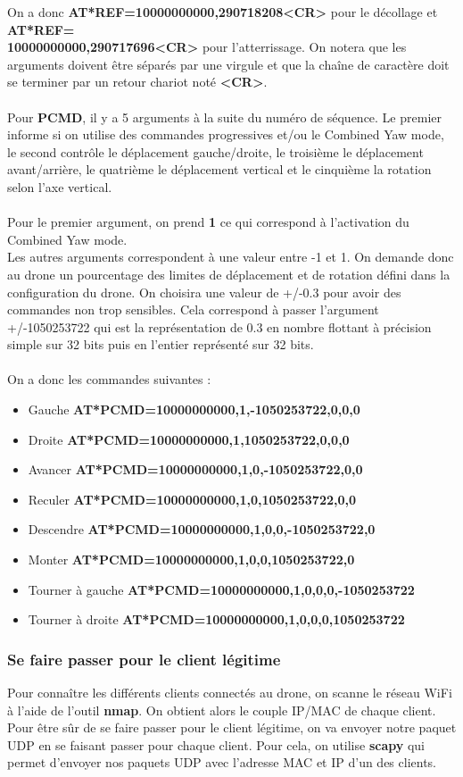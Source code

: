 On a donc \textbf{AT*REF=10000000000,290718208<CR>} pour le décollage et \textbf{AT*REF=}\\\textbf{10000000000,290717696<CR>} pour l'atterrissage. On notera que les arguments doivent être séparés par une virgule et que la chaîne de caractère doit se terminer par un retour chariot noté \textbf{<CR>}.\\\\
Pour \textbf{PCMD}, il y a 5 arguments à la suite du numéro de séquence. Le premier informe si on utilise des commandes progressives et/ou le Combined Yaw mode, le second contrôle le déplacement gauche/droite, le troisième le déplacement avant/arrière, le quatrième le déplacement vertical et le cinquième la rotation selon l'axe vertical.\\\\
Pour le premier argument, on prend \textbf{1} ce qui correspond à l'activation du Combined Yaw mode.\\
Les autres arguments correspondent à une valeur entre -1 et 1. On demande donc au drone un pourcentage des limites de déplacement et de rotation défini dans la configuration du drone. On choisira une valeur de +/-0.3 pour avoir des commandes non trop sensibles. Cela correspond à passer l'argument +/-1050253722 qui est la représentation de 0.3 en nombre flottant à précision simple sur 32 bits puis en l'entier représenté sur 32 bits.\\\\
On a donc les commandes suivantes :
\medbreak
\begin{itemize}
\item Gauche \textbf{AT*PCMD=10000000000,1,-1050253722,0,0,0}
\item Droite \textbf{AT*PCMD=10000000000,1,1050253722,0,0,0}
\item Avancer \textbf{AT*PCMD=10000000000,1,0,-1050253722,0,0}
\item Reculer \textbf{AT*PCMD=10000000000,1,0,1050253722,0,0}
\item Descendre \textbf{AT*PCMD=10000000000,1,0,0,-1050253722,0}
\item Monter \textbf{AT*PCMD=10000000000,1,0,0,1050253722,0}
\item Tourner à gauche \textbf{AT*PCMD=10000000000,1,0,0,0,-1050253722}
\item Tourner à droite \textbf{AT*PCMD=10000000000,1,0,0,0,1050253722}
\end{itemize}

\subsubsection{Se faire passer pour le client légitime}
Pour connaître les différents clients connectés au drone, on scanne le réseau WiFi à l'aide de l'outil \textbf{nmap}. On obtient alors le couple IP/MAC de chaque client. Pour être sûr de se faire passer pour le client légitime, on va envoyer notre paquet UDP en se faisant passer pour chaque client. Pour cela, on utilise \textbf{scapy} qui permet d'envoyer nos paquets UDP avec l'adresse MAC et IP d'un des clients.

